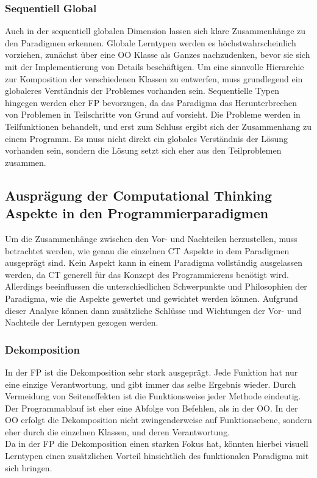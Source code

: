 \subsubsection{Sequentiell Global}
Auch in der sequentiell globalen Dimension lassen sich klare Zusammenhänge zu den Paradigmen erkennen. Globale Lerntypen werden es höchstwahrscheinlich vorziehen, zunächst über eine OO Klasse als Ganzes nachzudenken, bevor sie sich mit der Implementierung von Details beschäftigen. Um eine sinnvolle Hierarchie zur Komposition der verschiedenen Klassen zu entwerfen, muss grundlegend ein globaleres Verständnis der Problemes vorhanden sein.
Sequentielle Typen hingegen werden eher FP bevorzugen, da das Paradigma das Herunterbrechen von Problemen in Teilschritte von Grund auf vorsieht. Die Probleme werden in Teilfunktionen behandelt, und erst zum Schluss ergibt sich der Zusammenhang zu einem Programm. Es muss nicht direkt ein globales Verständnis der Lösung vorhanden sein, sondern die Lösung setzt sich eher aus den Teilproblemen zusammen.

\subsection{Ausprägung der Computational Thinking Aspekte in den Programmierparadigmen}
Um die Zusammenhänge zwischen den Vor- und Nachteilen herzustellen, muss betrachtet werden, wie genau die einzelnen CT Aspekte in dem Paradigmen ausgeprägt sind. Kein Aspekt kann in einem Paradigma vollständig ausgelassen werden, da CT generell für das Konzept des Programmierens benötigt wird. Allerdings beeinflussen die unterschiedlichen Schwerpunkte und Philosophien der Paradigma, wie die Aspekte gewertet und gewichtet werden können. 
Aufgrund dieser Analyse können dann zusätzliche Schlüsse und Wichtungen der Vor- und Nachteile der Lerntypen gezogen werden.

\subsubsection{Dekomposition}
In der FP ist die Dekomposition sehr stark ausgeprägt. Jede Funktion hat nur eine einzige Verantwortung, und gibt immer das selbe Ergebnis wieder. Durch Vermeidung von Seiteneffekten ist die Funktionsweise jeder Methode eindeutig. Der Programmablauf ist eher eine Abfolge von Befehlen, als in der OO. In der OO erfolgt die Dekomposition nicht zwingenderweise auf Funktionsebene, sondern eher durch die einzelnen Klassen, und deren Verantwortung.
\\
Da in der FP die Dekomposition einen starken Fokus hat, könnten hierbei visuell Lerntypen einen zusätzlichen Vorteil hinsichtlich des funktionalen Paradigma mit sich bringen.

